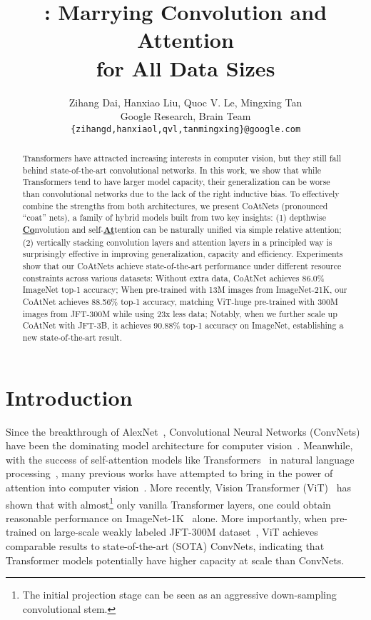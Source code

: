 \documentclass{article}
\title{
\name: Marrying Convolution and Attention \\ for All Data Sizes
}
\author{Zihang Dai, 
  Hanxiao Liu,
  Quoc V. Le, 
  Mingxing Tan \\
  Google Research, Brain Team \\
  \texttt{\{zihangd,hanxiaol,qvl,tanmingxing\}@google.com} \\
}
\newcommand{\name}{CoAtNet\xspace}
\begin{document}
\maketitle

\begin{abstract}
  Transformers have attracted increasing interests in computer vision, but they still fall behind state-of-the-art convolutional networks. In this work, we show that while Transformers tend to have larger model capacity, their generalization can be worse than convolutional networks due to the lack of the right inductive bias. To effectively combine the strengths from both architectures, we present \name{s} (pronounced ``coat'' nets), a family of hybrid models built from two key insights: (1) depthwise \textbf{\underline{Co}}nvolution and self-\textbf{\underline{At}}tention can be naturally unified via simple relative attention; (2) vertically stacking convolution layers and attention layers in a principled way is surprisingly effective in improving generalization, capacity and efficiency.
  Experiments show that our \name{s} achieve state-of-the-art performance under different resource constraints across various datasets:
  Without extra data, \name achieves 86.0\% ImageNet top-1 accuracy;
  When pre-trained with 13M images from ImageNet-21K, our \name achieves 88.56\% top-1 accuracy, matching ViT-huge pre-trained with 300M images from JFT-300M while using 23x less data;
  Notably, when we further scale up \name with  JFT-3B, it achieves 90.88\%  top-1 accuracy on ImageNet, establishing a new state-of-the-art result.
\end{abstract}

\section{Introduction}
\label{sec:intro}
Since the breakthrough of AlexNet~\cite{alexnet12}, Convolutional Neural Networks (ConvNets) have been the dominating model architecture for computer vision~\cite{simonyan2014very, he2016deep, szegedy2015going, efficientnet19}. 
Meanwhile, with the success of self-attention models like Transformers~\cite{vaswani2017attention} in natural language processing~\cite{devlin2018bert, brown2020language}, many previous works have attempted to bring in the power of attention into computer vision~\cite{wang2018non,bello2019attention,srinivas2021bottleneck,shen2021efficient}.
More recently, Vision Transformer (ViT)~\cite{dosovitskiy2020image} has shown that with almost\footnote{The initial projection stage can be seen as an aggressive down-sampling convolutional stem.} only vanilla Transformer layers, one could obtain reasonable performance on ImageNet-1K~\cite{deng2009imagenet} alone. More importantly, when pre-trained on large-scale weakly labeled JFT-300M dataset~\cite{sun2017revisiting}, ViT achieves comparable results to state-of-the-art (SOTA) ConvNets, indicating that Transformer models potentially have higher capacity at scale than ConvNets.
\end{document}
